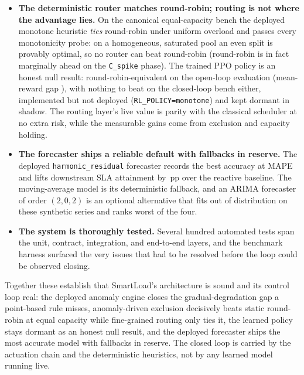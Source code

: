 \begin{itemize}
        \cite{liu2008isolationforest} is a selectable alternative. A separate
        threshold-versus-Isolation-Forest sweep, which does not involve the deployed
        detector, shows close cell agreement, with the Isolation Forest the more
        aggressive of the two.
  \item \textbf{The deterministic router matches round-robin; routing is not where the
        advantage lies.} On the canonical equal-capacity bench the deployed monotone
        heuristic \emph{ties} round-robin under uniform overload and passes every
        monotonicity probe: on a homogeneous, saturated pool an even split is provably
        optimal, so no router can beat round-robin (round-robin is in fact marginally
        ahead on the \texttt{C\_spike} phase). The trained PPO policy
        \cite{schulman2017ppo,raffin2021sb3} is an honest null result:
        round-robin-equivalent on the open-loop evaluation (mean-reward gap
        \BMrlPpoReward{}), with nothing to beat on the closed-loop bench either,
        implemented but not deployed (\texttt{RL\_POLICY=monotone}) and kept dormant in
        shadow. The routing layer's live value is parity with the classical scheduler at
        no extra risk, while the measurable gains come from exclusion and capacity holding.
  \item \textbf{The forecaster ships a reliable default with fallbacks in reserve.} The
        deployed \texttt{harmonic\_residual} forecaster records the best accuracy at
        \BMfcMape{} MAPE and lifts downstream SLA attainment by \BMfcSlaGain{}\,pp over the
        reactive baseline. The moving-average model is its deterministic fallback, and an
        ARIMA forecaster \cite{box2015timeseries} of order $(2,0,2)$ is an optional
        alternative that fits out of distribution on these synthetic series and ranks
        worst of the four.
  \item \textbf{The system is thoroughly tested.} Several hundred automated tests span the
        unit, contract, integration, and end-to-end layers, and the benchmark harness
        surfaced the very issues that had to be resolved before the loop could be observed
        closing.
\end{itemize}

Together these establish that SmartLoad's architecture is sound and its control loop
real: the deployed anomaly engine closes the gradual-degradation gap a point-based rule
misses, anomaly-driven exclusion decisively beats static round-robin at equal capacity
while fine-grained routing only ties it, the learned policy stays dormant as an honest
null result, and the deployed forecaster ships the most accurate model with fallbacks in
reserve. The closed loop is carried by the actuation chain and the deterministic
heuristics, not by any learned model running live.

